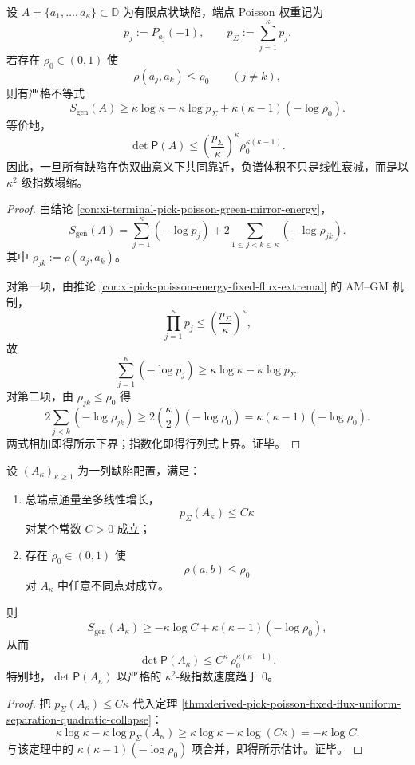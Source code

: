 \begin{theorem}[固定端点通量与统一分离阈值下的二次塌缩律]\label{thm:derived-pick-poisson-fixed-flux-uniform-separation-quadratic-collapse}
设 \(A=\{a_1,\dots,a_\kappa\}\subset\mathbb D\) 为有限点状缺陷，端点 Poisson 权重记为
\[
p_j:=P_{a_j}(-1),
\qquad
p_\Sigma:=\sum_{j=1}^{\kappa}p_j.
\]
若存在 \(\rho_0\in(0,1)\) 使
\[
\rho(a_j,a_k)\le \rho_0
\qquad
(j\neq k),
\]
则有严格不等式
\[
S_{\mathrm{gen}}(A)
\ge
\kappa\log\kappa-\kappa\log p_\Sigma+\kappa(\kappa-1)(-\log\rho_0).
\]
等价地，
\[
\det\mathsf P(A)\le \left(\frac{p_\Sigma}{\kappa}\right)^\kappa \rho_0^{\kappa(\kappa-1)}.
\]
因此，一旦所有缺陷在伪双曲意义下共同靠近，负谱体积不只是线性衰减，而是以 \(\kappa^2\) 级指数塌缩。
\end{theorem}
\begin{proof}
由结论 \ref{con:xi-terminal-pick-poisson-green-mirror-energy}，
\[
S_{\mathrm{gen}}(A)
=
\sum_{j=1}^{\kappa}(-\log p_j)
+2\sum_{1\le j<k\le\kappa}(-\log\rho_{jk}).
\]
其中 \(\rho_{jk}:=\rho(a_j,a_k)\)。

对第一项，由推论 \ref{cor:xi-pick-poisson-energy-fixed-flux-extremal} 的 AM--GM 机制，
\[
\prod_{j=1}^{\kappa}p_j\le \left(\frac{p_\Sigma}{\kappa}\right)^\kappa,
\]
故
\[
\sum_{j=1}^{\kappa}(-\log p_j)\ge \kappa\log\kappa-\kappa\log p_\Sigma.
\]
对第二项，由 \(\rho_{jk}\le \rho_0\) 得
\[
2\sum_{j<k}(-\log\rho_{jk})
\ge
2\binom{\kappa}{2}(-\log\rho_0)
=
\kappa(\kappa-1)(-\log\rho_0).
\]
两式相加即得所示下界；指数化即得行列式上界。证毕。
\end{proof}

\begin{corollary}[有界平均端点通量与统一分离阈值下不存在有限能热力学极限]\label{cor:derived-pick-poisson-no-finite-energy-thermodynamic-limit}
设 \((A_\kappa)_{\kappa\ge 1}\) 为一列缺陷配置，满足：
\begin{enumerate}
  \item 总端点通量至多线性增长，
  \[
  p_\Sigma(A_\kappa)\le C\kappa
  \]
  对某个常数 \(C>0\) 成立；
  \item 存在 \(\rho_0\in(0,1)\) 使
  \[
  \rho(a,b)\le \rho_0
  \]
  对 \(A_\kappa\) 中任意不同点对成立。
\end{enumerate}
则
\[
S_{\mathrm{gen}}(A_\kappa)\ge -\kappa\log C+\kappa(\kappa-1)(-\log\rho_0),
\]
从而
\[
\det\mathsf P(A_\kappa)\le C^\kappa\,\rho_0^{\kappa(\kappa-1)}.
\]
特别地，\(\det\mathsf P(A_\kappa)\) 以严格的 \(\kappa^2\)-级指数速度趋于 \(0\)。
\end{corollary}
\begin{proof}
把 \(p_\Sigma(A_\kappa)\le C\kappa\) 代入定理 \ref{thm:derived-pick-poisson-fixed-flux-uniform-separation-quadratic-collapse}：
\[
\kappa\log\kappa-\kappa\log p_\Sigma(A_\kappa)
\ge
\kappa\log\kappa-\kappa\log(C\kappa)
=
-\kappa\log C.
\]
与该定理中的 \(\kappa(\kappa-1)(-\log\rho_0)\) 项合并，即得所示估计。证毕。
\end{proof}

